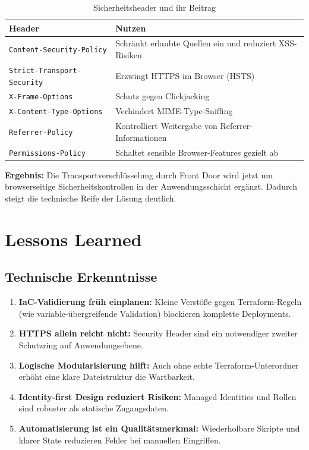 \documentclass[a4paper,11pt]{article}
\begin{document}
\begin{table}[H]
\centering
\caption{Sicherheitsheader und ihr Beitrag}
\begin{tabular}{p{}p{}}
\toprule
\textbf{Header} & \textbf{Nutzen} \\
\midrule
\texttt{Content-Security-Policy} & Schränkt erlaubte Quellen ein und reduziert XSS-Risiken \\
\texttt{Strict-Transport-Security} & Erzwingt HTTPS im Browser (HSTS) \\
\texttt{X-Frame-Options} & Schutz gegen Clickjacking \\
\texttt{X-Content-Type-Options} & Verhindert MIME-Type-Sniffing \\
\texttt{Referrer-Policy} & Kontrolliert Weitergabe von Referrer-Informationen \\
\texttt{Permissions-Policy} & Schaltet sensible Browser-Features gezielt ab \\
\bottomrule
\end{tabular}
\end{table}

\textbf{Ergebnis:} Die Transportverschlüsselung durch Front Door wird jetzt um browserseitige Sicherheitskontrollen in der Anwendungsschicht ergänzt.
Dadurch steigt die technische Reife der Lösung deutlich.

\section{Lessons Learned}
\subsection{Technische Erkenntnisse}
\begin{enumerate}
  \item \textbf{IaC-Validierung früh einplanen:} Kleine Verstöße gegen Terraform-Regeln (wie variable-übergreifende Validation) blockieren komplette Deployments.
  \item \textbf{HTTPS allein reicht nicht:} Security Header sind ein notwendiger zweiter Schutzring auf Anwendungsebene.
  \item \textbf{Logische Modularisierung hilft:} Auch ohne echte Terraform-Unterordner erhöht eine klare Dateistruktur die Wartbarkeit.
  \item \textbf{Identity-first Design reduziert Risiken:} Managed Identities und Rollen sind robuster als statische Zugangsdaten.
  \item \textbf{Automatisierung ist ein Qualitätsmerkmal:} Wiederholbare Skripte und klarer State reduzieren Fehler bei manuellen Eingriffen.
\end{enumerate}
\end{document}
